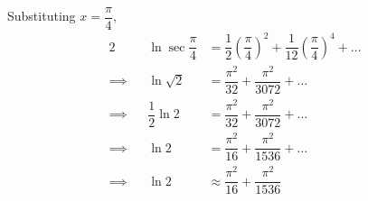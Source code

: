 \documentclass{jhwhw}
\begin{document}
                Substituting $x = \dfrac\pi4$,
                \begin{alignat*}{2}
                    &&\ln \sec \dfrac\pi4 &= \dfrac12 \left(\dfrac\pi4\right)^2 + \dfrac1{12} \left(\dfrac\pi4\right)^4 + \ldots\\
                    \implies&&\ln \sqrt2 &= \dfrac{\pi^2}{32} + \dfrac{\pi^2}{3072} + \ldots\\
                    \implies&&\dfrac12 \ln 2 &= \dfrac{\pi^2}{32} + \dfrac{\pi^2}{3072} + \ldots\\
                    \implies&&\ln 2 &= \dfrac{\pi^2}{16} + \dfrac{\pi^2}{1536} + \ldots\\
                    \implies&&\ln 2 &\approx \dfrac{\pi^2}{16} + \dfrac{\pi^2}{1536}
                \end{alignat*}
\end{document}
